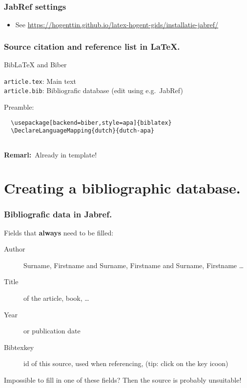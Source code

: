 \documentclass[aspectratio=169]{beamer}
\begin{document}
\begin{frame}
  \frametitle{JabRef settings}

  \begin{itemize}
    \item See \url{https://hogenttin.github.io/latex-hogent-gids/installatie-jabref/}
  \end{itemize}

\end{frame}
\begin{frame}[fragile]
  \frametitle{Source citation and reference list in {\LaTeX}.}

  Bib{\LaTeX} and Biber

  \vspace{18pt}

  \verb|article.tex|: Main text\\
  \verb|article.bib|: Bibliografic database (edit using e.g.~JabRef)

  \bigskip

  Preamble:

  \begin{verbatim}
  \usepackage[backend=biber,style=apa]{biblatex}
  \DeclareLanguageMapping{dutch}{dutch-apa}
  
  \end{verbatim}

  \textbf{Remarl:}\ Already in template!

\end{frame}

\section{Creating a bibliographic database.}

\begin{frame}
  \frametitle{Bibliografic data in Jabref.}

  Fields that \textbf{always} need to be filled:

  \begin{description}
    \item[Author] Surname, Firstname and Surname, Firstname and Surname, Firstname \ldots
    \item[Title] of the article, book, \ldots
    \item[Year] or publication date
    \item[Bibtexkey] id of this source, used when referencing, (tip: click on the key icoon)
  \end{description}
  \bigskip
  Impossible to fill in one of these fields? Then the source is probably unsuitable!
\end{frame}
\end{document}
